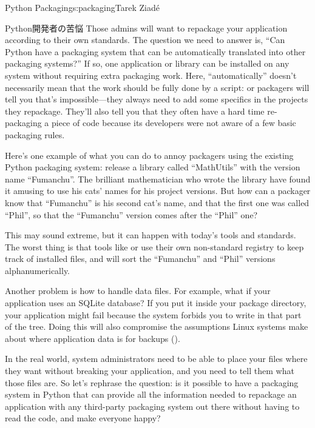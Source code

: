 \begin{aosachapter}{Python Packaging}{s:packaging}{Tarek Ziad\'{e}}
\begin{aosasect1}{Python開発者の苦悩}
Those admins will want to repackage your application according to
their own standards.  The question we need to answer is, ``Can Python
have a packaging system that can be automatically translated into
other packaging systems?''  If so, one application or library can be
installed on any system without requiring extra packaging work.  Here,
``automatically'' doesn't necessarily mean that the work should be
fully done by a script:  or  packagers will tell
you that's impossible---they always need to add some specifics in the
projects they repackage.  They'll also tell you that they
often have a hard time re-packaging a piece of code because its
developers were not aware of a few basic packaging rules.

Here's one example of what you can do to annoy packagers using the
existing Python packaging system: release a library called
``MathUtils'' with the version name ``Fumanchu''.  The brilliant
mathematician who wrote the library have found it amusing to use
his cats' names for his project versions.  But how can a packager know
that ``Fumanchu'' is his second cat's name, and that the first one was
called ``Phil'', so that the ``Fumanchu'' version comes after the
``Phil'' one?

This may sound extreme, but it can happen with today's tools and
standards.  The worst thing is that tools like  or
 use their own non-standard registry to keep track of
installed files, and will sort the ``Fumanchu'' and ``Phil'' versions
alphanumerically.

Another problem is how to handle data files.  For example, what if
your application uses an SQLite database?  If you put it inside your
package directory, your application might fail because the system
forbids you to write in that part of the tree.  Doing this will
also compromise the assumptions Linux systems make about where
application data is for backups ().

In the real world, system administrators need to be able to place your
files where they want without breaking your application, and you need
to tell them what those files are.  So let's rephrase the question: is
it possible to have a packaging system in Python that can provide all
the information needed to repackage an application with any
third-party packaging system out there without having to read the
code, and make everyone happy?

\end{aosasect1}


\end{aosachapter}
